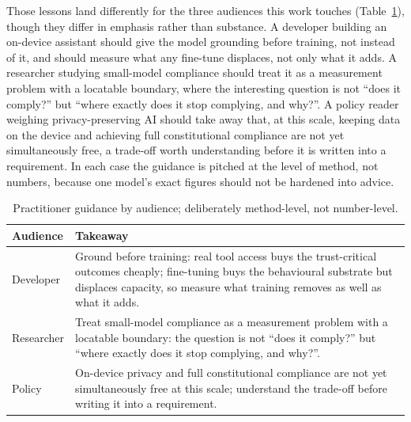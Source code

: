 Those lessons land differently for the three audiences this work touches (Table~\ref{tab:guidance}), though they differ in emphasis rather than substance. A developer building an on-device assistant should give the model grounding before training, not instead of it, and should measure what any fine-tune displaces, not only what it adds. A researcher studying small-model compliance should treat it as a measurement problem with a locatable boundary, where the interesting question is not ``does it comply?'' but ``where exactly does it stop complying, and why?''. A policy reader weighing privacy-preserving AI should take away that, at this scale, keeping data on the device and achieving full constitutional compliance are not yet simultaneously free, a trade-off worth understanding before it is written into a requirement. In each case the guidance is pitched at the level of method, not numbers, because one model's exact figures should not be hardened into advice.

\begin{table}[H]
  \centering
  \caption{Practitioner guidance by audience; deliberately method-level, not number-level.}
  \label{tab:guidance}
  \begin{tabular}{lp{11.4cm}}
    \toprule
    Audience & Takeaway \\
    \midrule
    Developer & Ground before training: real tool access buys the trust-critical outcomes cheaply; fine-tuning buys the behavioural substrate but displaces capacity, so measure what training removes as well as what it adds. \\
    Researcher & Treat small-model compliance as a measurement problem with a locatable boundary: the question is not ``does it comply?'' but ``where exactly does it stop complying, and why?''. \\
    Policy & On-device privacy and full constitutional compliance are not yet simultaneously free at this scale; understand the trade-off before writing it into a requirement. \\
    \bottomrule
  \end{tabular}
\end{table}


